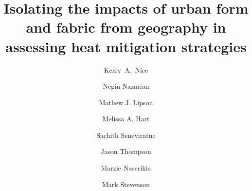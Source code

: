 \documentclass[final,3p,times,authoryear]{elsarticle}
\begin{document}

\title{Isolating the impacts of urban form and fabric from geography in assessing heat mitigation strategies }

\author[melb]{Kerry~A.~Nice}
\author[arc,built,city]{Negin Nazarian}
\author[arc]{Mathew J. Lipson}
\author[arc]{Melissa A. Hart}
\author[melb]{Sachith Seneviratne}
\author[melb]{Jason Thompson}
\author[arc]{Marzie Naserikia}
\author[melb,eng]{Mark Stevenson}
\address[melb]{Transport, Health, and Urban Design Research Lab, Faculty of Architecture, Building, and Planning, University of Melbourne, Australia.}
\address[arc]{ARC Centre of Excellence for Climate Extremes, University of New South Wales, Sydney, NSW, Australia.}
\address[built]{School of Built Environment, University of New South Wales, Sydney, NSW, Australia.}
\address[city]{City Futures Research Centre, University of New South Wales, Sydney, NSW, Australia.}
\address[eng]{Melbourne School of Engineering; and Melbourne School of Population and Global Health, University of Melbourne, Australia.}
\end{document}
